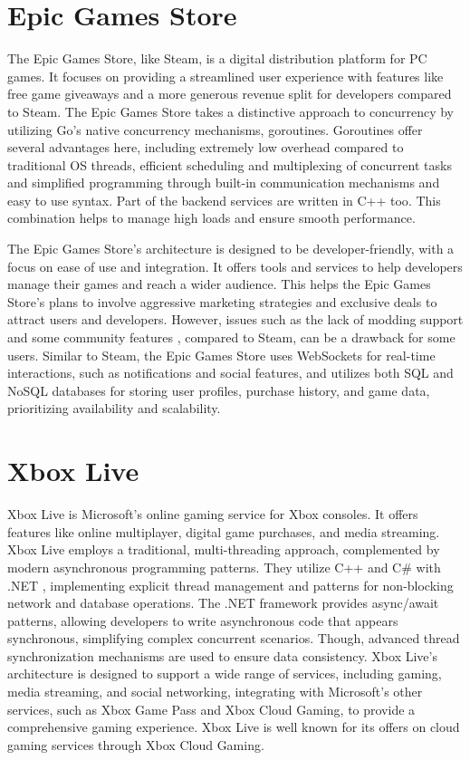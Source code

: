 \documentclass[]{final}
\begin{document}
\section{Epic Games Store}
The Epic Games Store, like Steam, is a digital distribution platform for
PC games. It focuses on providing a streamlined user experience with features
like free game giveaways and a more generous revenue split for developers
compared to Steam. The Epic Games Store takes a distinctive approach to concurrency by utilizing
Go's native concurrency mechanisms, goroutines\cite{epic_games_jobs}. Goroutines offer several
advantages here, including extremely low overhead compared to traditional OS threads,
efficient scheduling and multiplexing of concurrent tasks and simplified
programming through built-in communication mechanisms and easy to use syntax.
Part of the backend services are written in C++ too\cite{epic_games_jobs}. This combination
helps to manage high loads and ensure smooth performance.

The Epic Games Store's architecture is designed to be developer-friendly, with a
focus on ease of use and integration. It offers tools and services to help
developers manage their games and reach a wider audience. This helps the Epic Games
Store's plans to involve aggressive marketing strategies and exclusive
deals to attract users and developers. However, issues such as the lack of modding support and
some community features \cite{epic_games_dev_update}, compared to Steam, can be a drawback for some users.
Similar to Steam, the Epic Games Store uses WebSockets for real-time interactions,
such as notifications and social features, and utilizes both SQL and NoSQL
databases for storing user profiles, purchase history, and game data,
\cite{spring_epic_2016, epic_games_jobs} prioritizing availability and scalability.

\section{Xbox Live}
Xbox Live is Microsoft's online gaming service for Xbox consoles. It offers
features like online multiplayer, digital game purchases, and media streaming.
Xbox Live employs a traditional, multi-threading approach, complemented by modern
asynchronous programming patterns. They utilize C++ and C\# with .NET \cite{kevinasgari_microsoft.xbox.services_nodate}, implementing
explicit thread management and patterns for non-blocking network and database operations.
The .NET framework provides async/await patterns, allowing developers to write
asynchronous code that appears synchronous, simplifying complex concurrent scenarios.
Though, advanced thread synchronization mechanisms are used to ensure data consistency.
\cite{m-stahl_sdk_2023, woolsey_how_2024} Xbox Live's architecture is designed to support a wide range of services, including gaming,
media streaming, and social networking, integrating with Microsoft's other services, such as Xbox Game
Pass and Xbox Cloud Gaming, to provide a comprehensive gaming experience. Xbox Live is well known
for its offers on cloud gaming services through Xbox Cloud Gaming.
\end{document}
